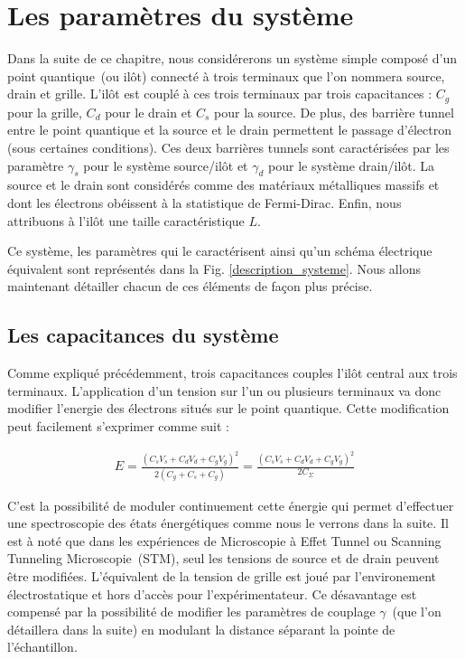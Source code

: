 \section{Les paramètres du système}
Dans la suite de ce chapitre, nous considérerons un système simple composé d'un point quantique~(ou ilôt) connecté à trois terminaux que l'on nommera source, drain et grille. L'il\^ot est couplé à ces trois terminaux par trois capacitances : $C_g$ pour la grille, $C_d$ pour le drain et $C_s$ pour la source. De plus, des barrière tunnel entre le point quantique et la source et le drain permettent le passage d'électron (sous certaines conditions). Ces deux barrières tunnels sont caractérisées par les paramètre $\gamma_s$ pour le système source/il\^ot et $\gamma_d$ pour le système drain/il\^ot. La source et le drain sont considérés comme des matériaux métalliques massifs et dont les électrons obéissent à la statistique de Fermi-Dirac. Enfin, nous attribuons à l'il\^ot une taille caractéristique $L$. 

Ce système, les paramètres qui le caractérisent ainsi qu'un schéma électrique équivalent sont représentés dans la Fig. \ref{description_systeme}. Nous allons maintenant détailler chacun de ces éléments de façon plus précise.


\subsection{Les capacitances du système}
Comme expliqué précédemment, trois capacitances couples l'il\^ot central aux trois terminaux. L'application d'un tension sur l'un ou plusieurs terminaux va donc modifier l'energie des électrons situés sur le point quantique. Cette modification peut facilement s'exprimer comme suit :

\begin{eqnarray}
E = \frac{(C_sV_s + C_dV_d + C_gV_g)^2}{2(C_g + C_s + C_g)}=\frac{(C_sV_s + C_dV_d + C_gV_g)^2}{2C_{\Sigma}} \nonumber
\end{eqnarray}

C'est la possibilité de moduler continuement cette énergie qui permet d'effectuer une spectroscopie des états énergétiques comme nous le verrons dans la suite. Il est à noté que dans les expériences de Microscopie à Effet Tunnel ou Scanning Tunneling Microscopie~(STM), seul les tensions de source et de drain peuvent \^etre modifiées. L'équivalent de la tension de grille est joué par l'environement électrostatique et hors d'accès pour l'expérimentateur. Ce désavantage est compensé par la possibilité de modifier les paramètres de couplage $\gamma$~(que l'on détaillera dans la suite) en modulant la distance séparant la pointe de l'échantillon.

